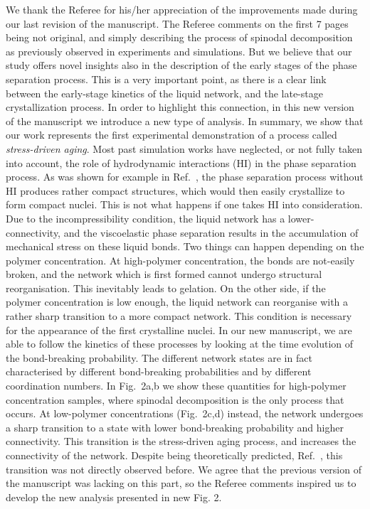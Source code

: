 \documentclass[11pt,a4paper]{article}
\begin{document}
We thank the Referee for his/her appreciation of the improvements made during our last revision of the manuscript. The Referee comments on the first 7 pages being not original, and simply describing the process of spinodal decomposition as previously observed in experiments and simulations. But we believe that our study offers novel insights also in the description of the early stages of the phase separation process. This is a very important point, as there is a clear link between the early-stage kinetics of the liquid network, and the late-stage crystallization process. In order to highlight this connection, in this new version of the manuscript we introduce a new type of analysis. In summary, we show that our work represents the first experimental demonstration of a process called \emph{stress-driven aging}. Most past simulation works have neglected, or not fully taken into account, the role of hydrodynamic interactions (HI) in the phase separation process. As was shown for example in Ref.~\cite{
furukawa2010key}, the phase separation process without HI produces rather compact structures, which would then easily crystallize to form compact nuclei. This is not what happens if one takes HI into consideration. Due to the incompressibility condition, the liquid network has a lower-connectivity, and the viscoelastic phase separation results in the accumulation of mechanical stress on these liquid bonds. Two things can happen depending on the polymer concentration. At high-polymer concentration, the bonds are not-easily broken, and the network which is first formed cannot undergo structural reorganisation. This inevitably leads to gelation. On the other side, if the polymer concentration is low enough, the liquid network can reorganise with a rather sharp transition to a more compact network. This condition is necessary for the appearance of the first crystalline nuclei. In our new manuscript, we are able to follow the kinetics of these processes by looking at the time evolution of the bond-breaking 
probability. The different network states are in fact characterised by different bond-breaking probabilities and by different coordination numbers. In Fig.~2a,b we show these quantities for high-polymer concentration samples, where spinodal decomposition is the only process that occurs. At low-polymer concentrations (Fig.~2c,d) instead, the network undergoes a sharp transition to a state with lower bond-breaking probability and higher connectivity. This transition is the stress-driven aging process, and increases the connectivity of the network. Despite being theoretically predicted, Ref.~\cite{tanaka2000,tanaka2007spontaneous}, this transition was not directly observed before.
We agree that the previous version of the manuscript was lacking on this part, so the Referee comments inspired us to develop the new analysis presented in new Fig. 2.
\end{document}
